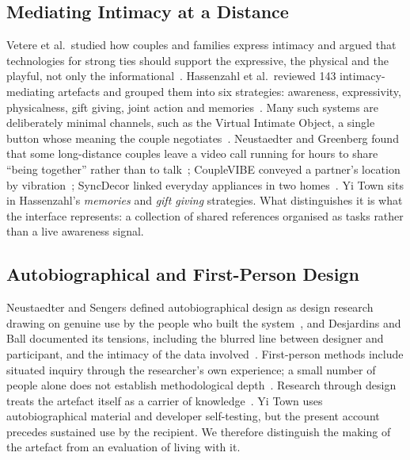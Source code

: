 \documentclass[sigconf,nonacm]{acmart}
\newcommand{\yt}{Yi Town}
\begin{document}
\subsection{Mediating Intimacy at a Distance}
Vetere et al.\ studied how couples and families express intimacy and argued that technologies for
strong ties should support the expressive, the physical and the playful, not only the
informational~\cite{vetere2005mediating}. Hassenzahl et al.\ reviewed 143 intimacy-mediating
artefacts and grouped them into six strategies: awareness, expressivity, physicalness, gift
giving, joint action and memories~\cite{hassenzahl2012love}. Many such systems are deliberately
minimal channels, such as the Virtual Intimate Object, a single button whose meaning the couple
negotiates~\cite{kaye2006clicked}. Neustaedter and Greenberg found that some long-distance couples
leave a video call running for hours to share ``being together'' rather than to
talk~\cite{neustaedter2012intimacy}; CoupleVIBE conveyed a partner's location by
vibration~\cite{bales2011couplevibe}; SyncDecor linked everyday appliances in two
homes~\cite{tsujita2008syncdecor}. \yt{} sits in Hassenzahl's \emph{memories} and \emph{gift giving}
strategies. What distinguishes it is what the interface represents: a collection of
shared references organised as tasks rather than a live awareness signal.

\subsection{Autobiographical and First-Person Design}
Neustaedter and Sengers defined autobiographical design as design research drawing on genuine
use by the people who built the system~\cite{neustaedter2012autobiographical}, and Desjardins
and Ball documented its tensions, including the blurred line between designer and
participant, and the intimacy of the data involved~\cite{desjardins2018tensions}. First-person
methods include situated inquiry through the researcher's own experience; a small
number of people alone does not establish methodological depth~\cite{lucero2019sample,desjardins2021firstperson}. Research through design treats the artefact itself as a carrier of
knowledge~\cite{zimmerman2007rtd,gaver2012expect}. \yt{} uses autobiographical material and developer self-testing, but the present account
precedes sustained use by the recipient. We therefore distinguish the making of the artefact
from an evaluation of living with it.
\end{document}
